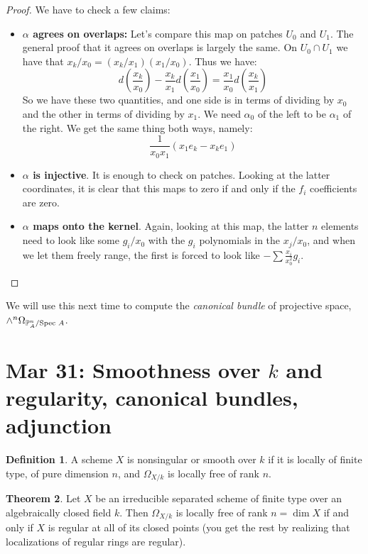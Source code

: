 \documentclass[10pt,reqno]{amsart}
\theoremstyle{definition}
\newtheorem{theorem}{Theorem}
\newtheorem{definition}[theorem]{Definition}
\theoremstyle{remark}
\numberwithin{equation}{section}
\numberwithin{theorem}{section}
\newcommand{\spec}{\textup{Spec }}
\newcommand{\PP}{{\mathbb P}}
\begin{document}
\begin{proof}
We have to check a few claims:
\begin{itemize}
\item \textbf{$\alpha$ agrees on overlaps:} Let's compare this map on patches $U_0$ and $U_1$. The general proof that it agrees on overlaps is largely the same. On $U_0 \cap U_1$ we have that $x_k/x_0 = (x_k/x_1)(x_1/x_0)$. Thus we have:
\[d\left(\frac{x_k}{x_0}\right) - \frac{x_k}{x_1}d\left(\frac{x_1}{x_0}\right) = \frac{x_1}{x_0}d\left(\frac{x_k}{x_1}\right)\]
So we have these two quantities, and one side is in terms of dividing by $x_0$ and the other in terms of dividing by $x_1$. We need $\alpha_0$ of the left to be $\alpha_1$ of the right. We get the same thing both ways, namely:
\[\frac{1}{x_0x_1}(x_1e_k - x_k e_1)\]
\item \textbf{$\alpha$ is injective}. It is enough to check on patches. Looking at the latter coordinates, it is clear that this maps to zero if and only if the $f_i$ coefficients are zero.
\item \textbf{$\alpha$ maps onto the kernel}. Again, looking at this map, the latter $n$ elements need to look like some $g_i/x_0$ with the $g_i$ polynomials in the $x_j/x_0$, and when we let them freely range, the first is forced to look like $- \sum \frac{x_i}{x_0^2} g_i$.  
\end{itemize}
\end{proof}

We will use this next time to compute the \textit{canonical bundle} of projective space, $\wedge^n \Omega_{\PP^n_A/\spec A}$.
\section{Mar 31: Smoothness over $k$ and regularity, canonical bundles, adjunction}
\begin{definition} A scheme $X$ is nonsingular or smooth over $k$ if it is locally of finite type, of pure dimension $n$, and $\Omega_{X/k}$ is locally free of rank $n$.
\end{definition}

\begin{theorem}
Let $X$ be an irreducible separated scheme of finite type over an algebraically closed field $k$. Then $\Omega_{X/k}$ is locally free of rank $n = \dim X$ if and only if $X$ is regular at all of its closed points (you get the rest by realizing that localizations of regular rings are regular).
\end{theorem}
\end{document}
